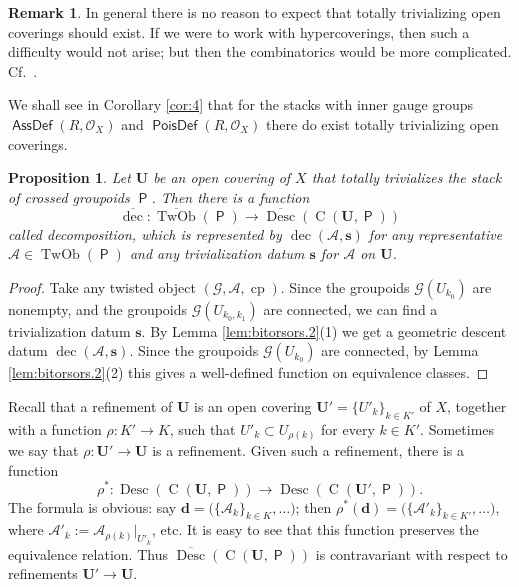 \documentclass[a4paper, 10pt]{amsart}
\newtheorem{prop}[equation]{Proposition}
\theoremstyle{definition}
\newtheorem{rem}[equation]{Remark}
\numberwithin{equation}{section}
\newcommand{\opn}{\operatorname}
\newcommand{\cat}[1]{\operatorname{\mathsf{#1}}}
\newcommand{\ol}{\overline}
\newcommand{\mcal}[1]{\mathcal{#1}}
\newcommand{\bsym}[1]{\boldsymbol{#1}}
\newcommand{\gerbe}[1]{\bsym{\mcal{#1}}}
\newcommand{\twocat}[1]{\operatorname{\bsym{\cat{#1}}}}
\newcommand{\lb}{\linebreak}
\begin{document}
\begin{rem}
In general there is no reason to expect that totally trivializing open
coverings should exist. If we were to work with hypercoverings,
then such a difficulty would not arise; but then the combinatorics would be
more complicated. Cf.\ \cite[Section 5]{Br}.

We shall see in Corollary \ref{cor:4}  that for
the stacks with inner gauge groups \lb
$\twocat{AssDef}(R,\mcal{O}_X)$ and $\twocat{PoisDef}(R, \mcal{O}_X)$
there do exist totally trivializing open coverings.
\end{rem}

\begin{prop} \label{prop:bitorsors.5}
Let $\bsym{U}$ be an open covering of $X$ that totally trivializes 
the stack of crossed groupoids $\twocat{P}$. Then  there is a function 
\[ \ol{\opn{dec}} :  \ol{\opn{TwOb}}(\twocat{P}) \to 
\ol{\opn{Desc}}(\opn{C}(\bsym{U}, \twocat{P})) \]
called {\em decomposition}, 
which is represented by $\opn{dec}(\gerbe{A}, \bsym{s})$
for any representative $\gerbe{A} \in \opn{TwOb}(\twocat{P})$ 
and any trivialization datum $\bsym{s}$ for $\gerbe{A}$ on $\bsym{U}$.
\end{prop}

\begin{proof}
Take any twisted object $(\gerbe{G}, \gerbe{A}, \opn{cp})$. 
Since the groupoids $\gerbe{G}(U_{k_0})$ are \lb nonempty, and
the groupoids $\gerbe{G}(U_{k_0, k_1})$ are connected, we can find 
a trivialization datum $\bsym{s}$. By Lemma \ref{lem:bitorsors.2}(1) we get 
a geometric descent datum $\opn{dec}(\gerbe{A}, \bsym{s})$.
Since the groupoids $\gerbe{G}(U_{k_0})$ are connected, 
by Lemma \ref{lem:bitorsors.2}(2) this gives a well-defined function on
equivalence classes.
\end{proof}

Recall that a refinement of  $\bsym{U}$ is an open covering 
$\bsym{U}' = \{ U'_k \}_{k \in K'}$ of $X$, together with a function
$\rho : K' \to K$, such that 
$U'_k \subset U_{\rho(k)}$ for every $k \in K'$.
Sometimes we say that $\rho : \bsym{U}' \to \bsym{U}$ is a
refinement. Given such a refinement, there is a function
\begin{equation} \label{eqn:23}
\rho^* : \opn{Desc}(\opn{C}(\bsym{U}, \twocat{P}))
\to \opn{Desc}(\opn{C}(\bsym{U}', \twocat{P})) . 
\end{equation}
The formula is obvious: say 
$\bsym{d} = \bigl( \{ \mcal{A}_k \}_{k \in K}, \ldots \bigr)$;
then 
$\rho^*(\bsym{d}) = \bigl( \{ \mcal{A}'_k \}_{k \in K'}, \ldots
\bigr)$, 
where $\mcal{A}'_{k} := \mcal{A}_{\rho(k)}|_{U'_k}$, etc. 
It is easy to see that this function preserves the equivalence
relation.
Thus $\ol{\opn{Desc}}(\opn{C}(\bsym{U}, \twocat{P}))$ is
contravariant with respect
to refinements $\bsym{U}' \to \bsym{U}$.
\end{document}
